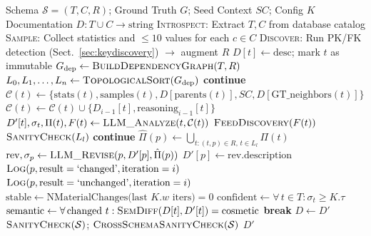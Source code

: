 \documentclass[twocolumn]{svjour3}
\begin{document}
\begin{algorithm}[htbp]
\caption{Iterative Schema Documentation with Context Propagation}
\label{alg:main}
\begin{algorithmic}[1]
\Require Schema $\mathcal{S} = (T, C, R)$; Ground Truth $G$; Seed Context $SC$; Config $K$
\Ensure Documentation $D : T \cup C \to \text{string}$
\State \textsc{Introspect}: Extract $T, C$ from database catalog
\State \textsc{Sample}: Collect statistics and $\leq 10$ values for each $c \in C$
\State \textsc{Discover}: Run PK/FK detection (Sect.~\ref{sec:keydiscovery}) $\to$ augment $R$
    \State $D[t] \gets \text{desc}$; mark $t$ as immutable
\EndFor
\State $G_{\text{dep}} \gets \textsc{BuildDependencyGraph}(T, R)$
\State $L_0, L_1, \ldots, L_n \gets \textsc{TopologicalSort}(G_{\text{dep}})$
     
             \textbf{continue} \EndIf
            \State $\mathcal{C}(t) \gets \{\text{stats}(t), \text{samples}(t), D[\text{parents}(t)], SC, D[\text{GT\_neighbors}(t)]\}$
             $\mathcal{C}(t) \gets \mathcal{C}(t) \cup \{D_{i-1}[t], \text{reasoning}_{i-1}[t]\}$ \EndIf
            \State $D'[t], \sigma_t, \Pi(t), F(t) \gets \textsc{LLM\_Analyze}(t, \mathcal{C}(t))$
            \State $\textsc{FeedDiscovery}(F(t))$
        \EndFor
        \State $\textsc{SanityCheck}(L_l)$
         
             \textbf{continue} \EndIf
            \State $\hat{\Pi}(p) \gets \bigcup_{t:(t,p) \in R,\, t \in L_l} \Pi(t)$
                \State $\text{rev}, \sigma_p \gets \textsc{LLM\_Revise}(p, D'[p], \hat{\Pi}(p))$
                    \State $D'[p] \gets \text{rev.description}$
                    \State $\textsc{Log}(p, \text{result}=\text{`changed'}, \text{iteration}=i)$
                \Else
                    \State $\textsc{Log}(p, \text{result}=\text{`unchanged'}, \text{iteration}=i)$
                \EndIf
            \EndIf
        \EndFor
    \EndFor
    \State $\text{stable} \gets \text{NMaterialChanges(last } K.w \text{ iters}) = 0$
    \State $\text{confident} \gets \forall\, t \in T : \sigma_t \geq K.\tau$
    \State $\text{semantic} \gets \forall\, \text{changed } t : \textsc{SemDiff}(D[t], D'[t]) = \text{cosmetic}$
        \State \textbf{break}
    \EndIf
    \State $D \gets D'$
\EndFor
\State $\textsc{SanityCheck}(\mathcal{S})$; $\textsc{CrossSchemaSanityCheck}(\mathcal{S})$
\State \Return $D'$
\end{algorithmic}
\end{algorithm}
\end{document}
